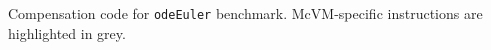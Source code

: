 \label{fig:CS-comp-code} Compensation code for {\tt odeEuler} benchmark. McVM-specific instructions are highlighted in grey.%
